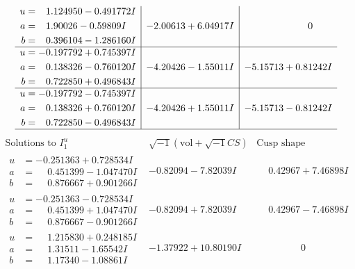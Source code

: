 \documentclass[1p]{elsarticle_modified}
\theoremstyle{definition}
\newcommand{\I}{\sqrt{-1}}
\begin{document}
$$\begin{array}{c|c|c}
\begin{aligned}
u &= \phantom{-}1.124950 - 0.491772 I \\
a &= \phantom{-}1.90026 - 0.59809 I \\
b &= \phantom{-}0.396104 - 1.286160 I\end{aligned}
 & -2.00613 + 6.04917 I & \phantom{-0.000000 } 0 \\ \hline\begin{aligned}
u &= -0.197792 + 0.745397 I \\
a &= \phantom{-}0.138326 - 0.760120 I \\
b &= \phantom{-}0.722850 + 0.496843 I\end{aligned}
 & -4.20426 - 1.55011 I & -5.15713 + 0.81242 I \\ \hline\begin{aligned}
u &= -0.197792 - 0.745397 I \\
a &= \phantom{-}0.138326 + 0.760120 I \\
b &= \phantom{-}0.722850 - 0.496843 I\end{aligned}
 & -4.20426 + 1.55011 I & -5.15713 - 0.81242 I\\
 \hline 
 \end{array}$$\newpage$$\begin{array}{c|c|c}  
\text{Solutions to }I^u_{1}& \I (\text{vol} + \sqrt{-1}CS) & \text{Cusp shape}\\
 \hline 
\begin{aligned}
u &= -0.251363 + 0.728534 I \\
a &= \phantom{-}0.451399 - 1.047470 I \\
b &= \phantom{-}0.876667 + 0.901266 I\end{aligned}
 & -0.82094 - 7.82039 I & \phantom{-}0.42967 + 7.46898 I \\ \hline\begin{aligned}
u &= -0.251363 - 0.728534 I \\
a &= \phantom{-}0.451399 + 1.047470 I \\
b &= \phantom{-}0.876667 - 0.901266 I\end{aligned}
 & -0.82094 + 7.82039 I & \phantom{-}0.42967 - 7.46898 I \\ \hline\begin{aligned}
u &= \phantom{-}1.215830 + 0.248185 I \\
a &= \phantom{-}1.31511 - 1.65542 I \\
b &= \phantom{-}1.17340 - 1.08861 I\end{aligned}
 & -1.37922 + 10.80190 I & \phantom{-0.000000 } 0 \\ \hline\begin{aligned}

\end{aligned}
\end{array}$$
\end{document}
